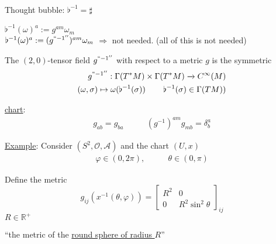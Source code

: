 Thought bubble: $\flat^{-1} = \sharp$

$\flat^{-1}(\omega)^a := g^{am}\omega_m$ \\
$\flat^{-1}(\omega)^a := (g^{``-1''})^{am}\omega_m$
$\Longrightarrow $ not needed.  (all of this is not needed)

\begin{definition}
  The $(2,0)$-tensor field $g^{``-1''}$ with respect to a metric $g$ is the symmetric
\[
\begin{aligned}
  g^{``-1''} : \Gamma(T^*M) \times \Gamma(T^*M) \xrightarrow{ ~ } C^{\infty}(M) \\
  (\omega, \sigma) \mapsto \omega( \flat^{-1}(\sigma)) \quad \quad \, \flat^{-1}(\sigma) \in \Gamma(TM))
\end{aligned}
\]

\underline{chart}:
\begin{align*}
g_{ab} = g_{ba} & \quad \quad (g^{-1})^{am} g_{mb} = \delta^a_b
\end{align*}
\end{definition}

\underline{Example}: Consider $(S^2, \mathcal{O}, \mathcal{A})$ and the chart $(U,x)$
\begin{align*}
\varphi \in (0,2\pi), & \quad \quad \theta \in (0,\pi)
\end{align*}

Define the metric \\
\[
g_{ij}(x^{-1}(\theta,\varphi)) = \left[ \begin{matrix} R^2 & 0 \\
    0 & R^2\sin^2{\theta} \end{matrix} \right]_{ij}
\]
$R \in \mathbb{R}^+$

``the metric of the \underline{round sphere of radius $R$}''

